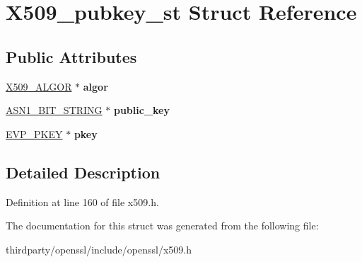 \hypertarget{struct_x509__pubkey__st}{}\section{X509\+\_\+pubkey\+\_\+st Struct Reference}
\label{struct_x509__pubkey__st}
\subsection*{Public Attributes}
\begin{DoxyCompactItemize}
\item 
\mbox{\label{struct_x509__pubkey__st_a0fb9c56d9396c7fffdb67e9c758be102}} 
\hyperlink{struct_x509__algor__st}{X509\+\_\+\+A\+L\+G\+OR} $\ast$ {\bfseries algor}
\item 
\mbox{\label{struct_x509__pubkey__st_ae2fae3c3fa6b2d0a28b5873da1361250}} 
\hyperlink{structasn1__string__st}{A\+S\+N1\+\_\+\+B\+I\+T\+\_\+\+S\+T\+R\+I\+NG} $\ast$ {\bfseries public\+\_\+key}
\item 
\mbox{\label{struct_x509__pubkey__st_a3ffae0e6f6a9c34c52339de00d8a8234}} 
\hyperlink{structevp__pkey__st}{E\+V\+P\+\_\+\+P\+K\+EY} $\ast$ {\bfseries pkey}
\end{DoxyCompactItemize}


\subsection{Detailed Description}


Definition at line 160 of file x509.\+h.



The documentation for this struct was generated from the following file\+:\begin{DoxyCompactItemize}
\item 
thirdparty/openssl/include/openssl/x509.\+h\end{DoxyCompactItemize}
